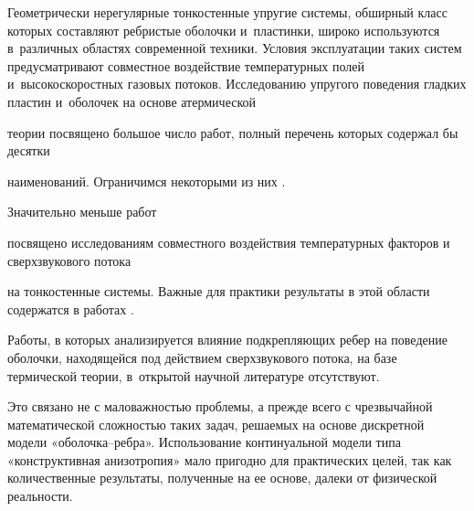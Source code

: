





\renewcommand{\JournalDataOnline}{\displaydate{myle}}



\makerutitle







Геометрически нерегулярные тонкостенные упругие системы, обширный класс которых составляют ребристые оболочки и~пластинки, широко используются в~различных областях современной техники. Условия эксплуатации таких систем предусматривают совместное воздействие температурных полей и~высокоскоростных газовых потоков. Исследованию упругого поведения гладких пластин и~оболочек на основе атермической

теории посвящено большое число работ, полный перечень которых содержал бы десятки

наименований. Ограничимся некоторыми из них \cite{myl-bib:1, myl-bib:2, myl-bib:3,myl-bib:4,myl-bib:5,myl-bib:5a}.

Значительно меньше работ

посвящено  исследованиям совместного воздействия температурных факторов и сверхзвукового потока

на тонкостенные системы. Важные для практики результаты в этой области содержатся в работах \cite{myl-bib:6, myl-bib:7, myl-bib:8}.




Работы, в которых анализируется влияние подкрепляющих  ребер на поведение оболочки, находящейся под действием сверхзвукового потока, на базе термической теории, в~открытой научной литературе отсутствуют. 

Это связано не с маловажностью проблемы, а прежде всего с чрезвычайной математической сложностью таких задач, решаемых на основе дискретной модели «оболочка–ребра». Использование континуальной модели типа «конструктивная анизотропия» мало пригодно для практических целей, так как количественные результаты, полученные на ее основе, далеки от физической реальности.



